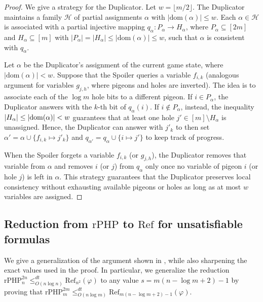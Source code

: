 \begin{proof}
    We give a strategy for the Duplicator. Let $w = \lfloor m/2 \rfloor$. The Duplicator maintains a family $\mathcal{H}$ of partial assignments $\alpha$ with $|\text{dom}(\alpha)| \le w$. Each $\alpha \in \mathcal{H}$ is associated with a partial injective mapping $q_\alpha: P_\alpha \to H_\alpha$, where $P_\alpha \subseteq [2m]$ and $H_\alpha \subseteq [m]$ with $|P_\alpha| = |H_\alpha| \le |\text{dom}(\alpha)| \le w$, such that $\alpha$ is consistent with $q_\alpha$.

    Let $\alpha$ be the Duplicator's assignment of the current game state, where $|\mathrm{dom}(\alpha)| < w$. Suppose that the Spoiler queries a variable $f_{i,k}$ (analogous argument for variables $g_{j,h}$, where pigeons and holes are inverted). The idea is to associate each of the $\log m$ hole bits to a different pigeon. If $i \in P_\alpha$, the Duplicator answers with the $k$-th bit of $q_\alpha(i)$. If $i \notin P_\alpha$, instead, the inequality $\left|H_\alpha\right| \leq \left|\mathrm{dom}(\alpha)\right| < w$ guarantees that at least one hole $j' \in [m]\setminus H_\alpha$ is unassigned. Hence, the Duplicator can answer with $j'_k$ to then set $\alpha' = \alpha \cup \{f_{i,k} \mapsto j'_k\}$ and $q_{\alpha'} = q_\alpha \cup \{i \mapsto j'\}$ to keep track of progress.
    
    When the Spoiler forgets a variable $f_{i,k}$ (or $g_{j,h}$), the Duplicator removes that variable from $\alpha$ and removes $i$ (or $j$) from $q_\alpha$ only once no variable of pigeon $i$ (or hole $j$) is left in $\alpha$. This strategy guarantees that the Duplicator preserves local consistency without exhausting available pigeons or holes as long as at most $w$ variables are assigned.
\end{proof}

\subsection{Reduction from $\mathrm{rPHP}$ to $\mathrm{Ref}$ for unsatisfiable formulas}
\label{sec:rPHP_Ref}

We give a generalization of the argument shown in \cite{res_nphard, res_ref_bounds, alg_nphard}, while also sharpening the exact values used in the proof. In particular, we generalize the reduction $\mathrm{rPHP}^{2n}_{n} \leq^{dt}_{O(n\log n)} \mathrm{Ref}_{n^2}(\varphi)$ to any value $s = m(n-\log m +2)-1$ by proving that $\mathrm{rPHP}^{2m}_{m} \leq^{dt}_{O(n\log m)} \mathrm{Ref}_{m(n-\log m +2)-1}(\varphi)$.

